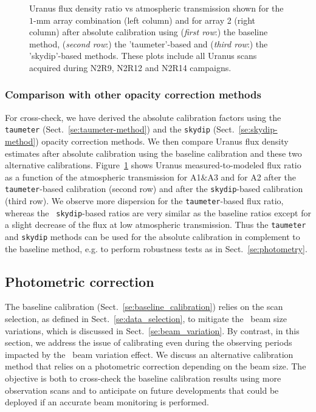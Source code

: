 \begin{figure}[!htbp]
\begin{center}
  \caption[Uranus flux density stability against atmospheric
    transmission]{Uranus flux density ratio vs atmospheric transmission
    shown for the $1$-mm array
    combination (left column) and for array 2 (right column) after absolute
    calibration using (\emph{first row}:) the baseline method, (\emph{second row}:) the 'taumeter'-based and
    (\emph{third row}:) the 'skydip'-based methods. These plots
    include all Uranus scans acquired during N2R9, N2R12 and N2R14
    campaigns. }
  \label{fig:calib_uranus_vs_atmtrans}
\end{center}
\end{figure}
%


\subsubsection{Comparison with other opacity correction methods}
\label{se:baseline_calibration_opacity}

For cross-check, we have derived the absolute
calibration factors using the {\tt taumeter}
(Sect.~\ref{se:taumeter-method}) and the {\tt skydip}
(Sect.~\ref{se:skydip-method}) opacity
correction methods. We then compare Uranus
flux density estimates after absolute calibration using the baseline
calibration and these two alternative
calibrations. Figure~\ref{fig:calib_uranus_vs_atmtrans}
shows Uranus measured-to-modeled
flux ratio as a function of the atmospheric transmission for A1$\&$A3
and for A2 after the {\tt taumeter}-based calibration (second row) and
after the {\tt skydip}-based calibration (third row). We observe more
dispersion for the {\tt taumeter}-based flux ratio, whereas the {\tt
skydip}-based ratios are very similar as the baseline ratios except
for a slight decrease of the flux at low atmospheric
transmission. Thus the {\tt taumeter} and {\tt skydip} methods can be used for
the absolute calibration in complement to the baseline method, e.g. to
perform robustness tests as in Sect.~\ref{se:photometry}. 



\subsection{Photometric correction}
\label{se:photometric_correction}

The baseline calibration (Sect.~\ref{se:baseline_calibration}) relies
on the scan selection, as defined in Sect.~\ref{se:data_selection}, to
mitigate the \afternoon\ beam size variations, which is discussed in
Sect.~\ref{se:beam_variation}. By contrast, in this section, we
address the issue of calibrating even during the observing periods
impacted by the \afternoon\ beam variation effect. We discuss an
alternative calibration method that
relies on a photometric correction depending on the beam size. The
objective is both to cross-check the baseline calibration results
using more observation scans and to anticipate on future developments
that could be deployed if an accurate beam monitoring is performed.



